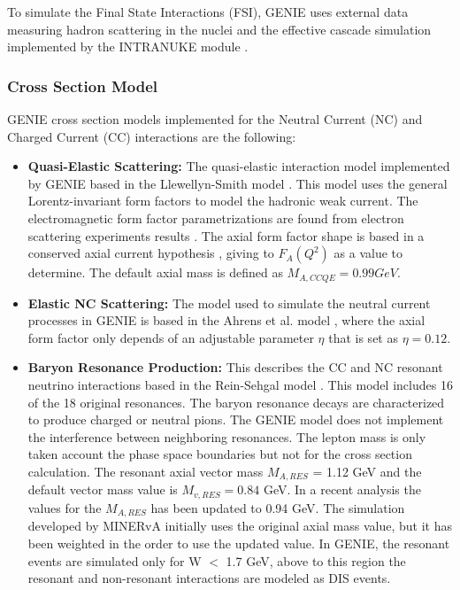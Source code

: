 To simulate the Final State Interactions (FSI), GENIE uses external data measuring hadron scattering in the nuclei and the effective cascade simulation implemented by the INTRANUKE module \cite{Genie}. 


\subsubsection{Cross Section Model}
\label{Cap:Simulation:GENIE:CrossSectionModel}

GENIE cross section models implemented for the Neutral Current (NC) and Charged Current (CC) interactions are the following:

\begin{itemize}
    \item \textbf{Quasi-Elastic Scattering:} The quasi-elastic interaction model implemented by GENIE based in the Llewellyn-Smith model \cite{LLEWELLYNSMITH1972261}. This model uses the general Lorentz-invariant form factors to model the hadronic weak current. The electromagnetic form factor parametrizations are found from electron scattering experiments results \cite{BRADFORD2006127}. The axial form factor shape is based in a conserved axial current hypothesis \cite{LLEWELLYNSMITH1972261}, giving to $F_A(Q^2)$ as a value to determine. The default axial mass is defined as $M_{A,CCQE}=0.99 GeV$.
    
    \item \textbf{Elastic NC Scattering:} The model used to simulate the neutral current processes in GENIE is based in the Ahrens et al. model \cite{Ahrens:PhysRevD.35.785}, where the axial form factor only depends of an adjustable parameter $\eta$ that is set as $\eta=0.12$. 
    
    \item \textbf{Baryon Resonance Production:} This describes the CC and NC resonant neutrino interactions based in the Rein-Sehgal model \cite{REIN198179}. This model includes 16 of the 18 original resonances. The baryon resonance decays are characterized to produce charged or neutral pions. The GENIE model does not implement the interference between neighboring resonances. The lepton mass is only taken account the phase space boundaries but not for the cross section calculation. The resonant axial vector mass $M_{A,RES}$ = 1.12 GeV \cite{Kuzmin:2006dh} and the default vector mass value is $M_{v,RES}=0.84$ GeV. In a recent analysis the values for the $M_{A,RES}$ has been updated to 0.94 GeV. The simulation developed by MINERvA initially uses the original axial mass value, but it has been weighted in the order to use the updated value. In GENIE, the resonant events are simulated only for W $<$ 1.7 GeV, above to this region the resonant and non-resonant interactions are modeled as DIS events. 
    

\end{itemize}

